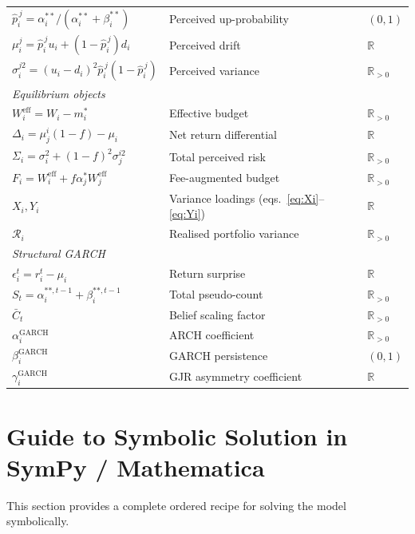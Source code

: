 \documentclass[12pt,a4paper]{article}
\newcommand{\R}{\mathbb{R}}
\newcommand{\1}{\mathbf{1}}
\newcommand{\hatpij}{\hat{p}_i^{\,j}}
\begin{document}
\begin{table}[H]
\begin{tabular}{@{} l l l @{}}
    $\hatpij = \alpha_i^{**}/(\alpha_i^{**}+\beta_i^{**})$ & Perceived up-probability & $(0,1)$ \\
    $\mu_i^j = \hatpij u_i + (1-\hatpij)d_i$ & Perceived drift & $\R$ \\
    $\sigma_i^{j2} = (u_i-d_i)^2\hatpij(1-\hatpij)$ & Perceived variance & $\R_{>0}$ \\
    \midrule
    \multicolumn{3}{l}{\textit{Equilibrium objects}} \\
    $W_i^{\mathrm{eff}} = W_i - m_i^*$ & Effective budget & $\R_{>0}$ \\
    $\Delta_i = \mu_j^i(1-f)-\mu_i$ & Net return differential & $\R$ \\
    $\Sigma_i = \sigma_i^2+(1-f)^2\sigma_j^{i2}$ & Total perceived risk & $\R_{>0}$ \\
    $F_i = W_i^{\mathrm{eff}}+f\alpha_j^* W_j^{\mathrm{eff}}$ & Fee-augmented budget & $\R_{>0}$ \\
    $X_i, Y_i$ & Variance loadings (eqs.~\eqref{eq:Xi}--\eqref{eq:Yi}) & $\R$ \\
    $\mathcal{R}_i$ & Realised portfolio variance & $\R_{>0}$ \\
    \midrule
    \multicolumn{3}{l}{\textit{Structural GARCH}} \\
    $\epsilon_i^t = r_i^t - \mu_i$ & Return surprise & $\R$ \\
    $S_t = \alpha_i^{**,t-1}+\beta_i^{**,t-1}$ & Total pseudo-count & $\R_{>0}$ \\
    $\bar{C}_t$ & Belief scaling factor & $\R_{>0}$ \\
    $\alpha_i^{\mathrm{GARCH}}$ & ARCH coefficient & $\R_{>0}$ \\
    $\beta_i^{\mathrm{GARCH}}$ & GARCH persistence & $(0,1)$ \\
    $\gamma_i^{\mathrm{GARCH}}$ & GJR asymmetry coefficient & $\R$ \\
    \bottomrule
  \end{tabular}
\end{table}

\section{Guide to Symbolic Solution in SymPy / Mathematica}

This section provides a complete ordered recipe for solving the model symbolically.
\end{document}
